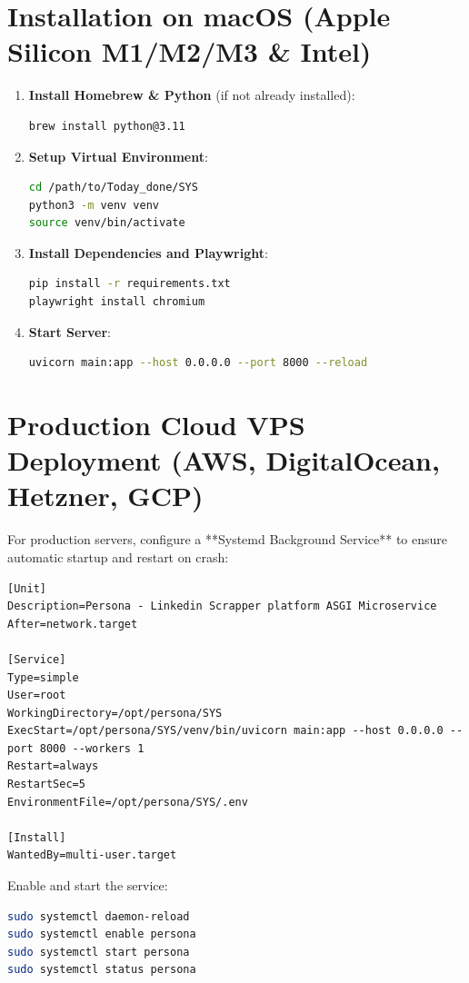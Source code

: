 \documentclass[11pt,a4paper]{report}
\begin{document}
\section{Installation on macOS (Apple Silicon M1/M2/M3 \& Intel)}
\begin{enumerate}[leftmargin=*]
    \item \textbf{Install Homebrew \& Python} (if not already installed):
\begin{lstlisting}[language=bash]
brew install python@3.11
\end{lstlisting}
    \item \textbf{Setup Virtual Environment}:
\begin{lstlisting}[language=bash]
cd /path/to/Today_done/SYS
python3 -m venv venv
source venv/bin/activate
\end{lstlisting}
    \item \textbf{Install Dependencies and Playwright}:
\begin{lstlisting}[language=bash]
pip install -r requirements.txt
playwright install chromium
\end{lstlisting}
    \item \textbf{Start Server}:
\begin{lstlisting}[language=bash]
uvicorn main:app --host 0.0.0.0 --port 8000 --reload
\end{lstlisting}
\end{enumerate}

\section{Production Cloud VPS Deployment (AWS, DigitalOcean, Hetzner, GCP)}
For production servers, configure a **Systemd Background Service** to ensure automatic startup and restart on crash:

\begin{lstlisting}[caption=Systemd Service Unit: /etc/systemd/system/persona.service]
[Unit]
Description=Persona - Linkedin Scrapper platform ASGI Microservice
After=network.target

[Service]
Type=simple
User=root
WorkingDirectory=/opt/persona/SYS
ExecStart=/opt/persona/SYS/venv/bin/uvicorn main:app --host 0.0.0.0 --port 8000 --workers 1
Restart=always
RestartSec=5
EnvironmentFile=/opt/persona/SYS/.env

[Install]
WantedBy=multi-user.target
\end{lstlisting}

Enable and start the service:
\begin{lstlisting}[language=bash]
sudo systemctl daemon-reload
sudo systemctl enable persona
sudo systemctl start persona
sudo systemctl status persona
\end{lstlisting}
\end{document}
